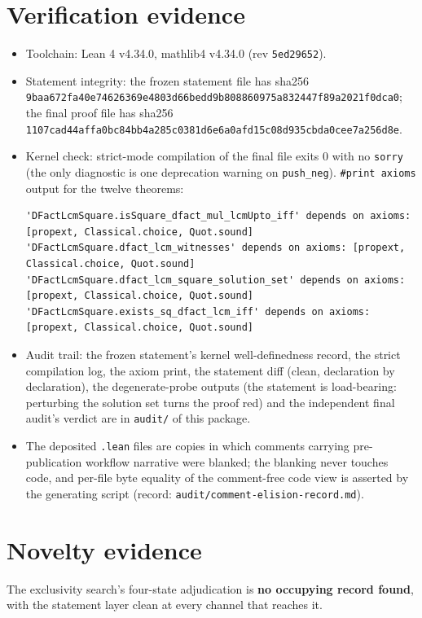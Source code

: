 \documentclass[11pt]{article}
\begin{document}
\section{Verification evidence}
\begin{itemize}
\item Toolchain: Lean 4 v4.34.0, mathlib4 v4.34.0 (rev \texttt{5ed29652}).
\item Statement integrity: the frozen statement file has sha256
      \texttt{9baa672fa40e74626369e4803d66bedd9b808860975a832447f89a2021f0dca0};
      the final proof file has sha256
      \texttt{1107cad44affa0bc84bb4a285c0381d6e6a0afd15c08d935cbda0cee7a256d8e}.
\item Kernel check: strict-mode compilation of the final file exits 0 with no
      \texttt{sorry} (the only diagnostic is one deprecation warning on \texttt{push\_neg}).
      \texttt{\#print axioms} output for the twelve theorems:
\begin{verbatim}
'DFactLcmSquare.isSquare_dfact_mul_lcmUpto_iff' depends on axioms: [propext, Classical.choice, Quot.sound]
'DFactLcmSquare.dfact_lcm_witnesses' depends on axioms: [propext, Classical.choice, Quot.sound]
'DFactLcmSquare.dfact_lcm_square_solution_set' depends on axioms: [propext, Classical.choice, Quot.sound]
'DFactLcmSquare.exists_sq_dfact_lcm_iff' depends on axioms: [propext, Classical.choice, Quot.sound]
\end{verbatim}
\item Audit trail: the frozen statement's kernel well-definedness record, the strict
      compilation log, the axiom print, the statement diff (clean, declaration by
      declaration), the degenerate-probe outputs (the statement is load-bearing: perturbing
      the solution set turns the proof red) and the independent final audit's verdict are in
      \texttt{audit/} of this package.
\item The deposited \texttt{.lean} files are copies in which comments carrying
      pre-publication workflow narrative were blanked; the blanking never touches code, and
      per-file byte equality of the comment-free code view is asserted by the generating
      script (record: \texttt{audit/comment-elision-record.md}).
\end{itemize}

\section{Novelty evidence}
The exclusivity search's four-state adjudication is \textbf{no occupying record found},
with the statement layer clean at every channel that reaches it.
\end{document}
